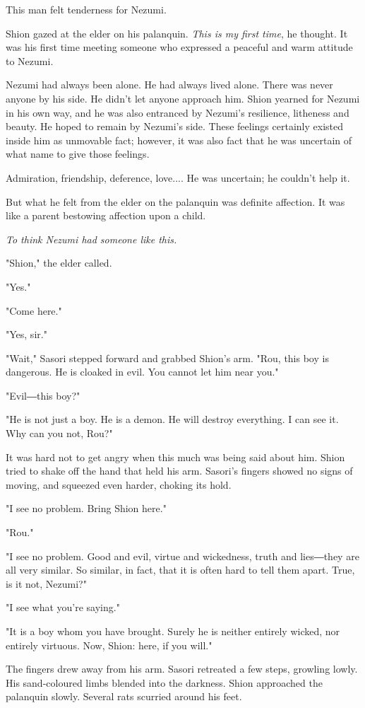 This man felt tenderness for Nezumi.

Shion gazed at the elder on his palanquin. \emph{This is my first time}, he
thought. It was his first time meeting someone who expressed a peaceful
and warm attitude to Nezumi.

Nezumi had always been alone. He had always lived alone. There was never
anyone by his side. He didn't let anyone approach him. Shion yearned for
Nezumi in his own way, and he was also entranced by Nezumi's resilience,
litheness and beauty. He hoped to remain by Nezumi's side. These
feelings certainly existed inside him as unmovable fact; however, it was
also fact that he was uncertain of what name to give those feelings.

Admiration, friendship, deference, love.... He was uncertain; he
couldn't help it.

But what he felt from the elder on the palanquin was definite affection.
It was like a parent bestowing affection upon a child.

\emph{To think Nezumi had someone like this.}

"Shion," the elder called.

"Yes."

"Come here."

"Yes, sir."

"Wait," Sasori stepped forward and grabbed Shion's arm. "Rou, this boy
is dangerous. He is cloaked in evil. You cannot let him near you."

"Evil―this boy?"

"He is not just a boy. He is a demon. He will destroy everything. I can
see it. Why can you not, Rou?"

It was hard not to get angry when this much was being said about him.
Shion tried to shake off the hand that held his arm. Sasori's fingers
showed no signs of moving, and squeezed even harder, choking its hold.

"I see no problem. Bring Shion here."

"Rou."

"I see no problem. Good and evil, virtue and wickedness, truth and
lies―they are all very similar. So similar, in fact, that it is often
hard to tell them apart. True, is it not, Nezumi?"

"I see what you're saying."

"It is a boy whom you have brought. Surely he is neither entirely
wicked, nor entirely virtuous. Now, Shion: here, if you will."

The fingers drew away from his arm. Sasori retreated a few steps,
growling lowly. His sand-coloured limbs blended into the darkness. Shion
approached the palanquin slowly. Several rats scurried around his feet.~

